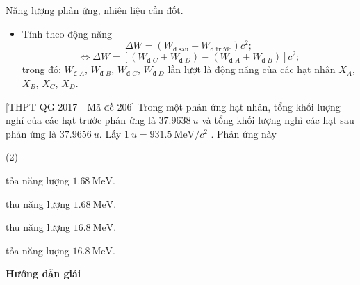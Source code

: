 \begin{dang}{Năng lượng phản ứng, nhiên liệu cần đốt.}
{\begin{itemize}
\begin{itemize}
				\item $W_{\textrm{lkr }A}$, $W_{\textrm{lkr }B}$, $W_{\textrm{lkr }C}$, $W_{\textrm{lkr }D}$ lần lượt là năng lượng liên kết riêng của các hạt nhân $X_A$, $X_B$, $X_C$, $X_D$.
				
				\item $A_A$, $A_B$, $A_C$, $A_D$ lần lượt là số khối của các hạt nhân $X_A$, $X_B$, $X_C$, $X_D$.
			\end{itemize}
			
			\item Tính theo động năng
			\begin{equation*}
				\Delta W = \left(W_\textrm{đ sau} - W_\textrm{đ trước}\right) c^2;
			\end{equation*}
			\begin{equation*}
				\Leftrightarrow \Delta W = \left[ \left(W_{\textrm{đ }C} + W_{\textrm{đ }D}\right)  - \left( W_{\textrm{đ }A} + W_{\textrm{đ }B}\right)\right]  c^2;
			\end{equation*}
			trong đó: $W_{\textrm{đ }A}$, $W_{\textrm{đ }B}$, $W_{\textrm{đ }C}$, $W_{\textrm{đ }D}$ lần lượt là động năng của các hạt nhân $X_A$, $X_B$, $X_C$, $X_D$.
	\end{itemize}}
	
	
	{
		[THPT QG 2017 - Mã đề 206] Trong một phản ứng hạt nhân, tổng khối lượng nghỉ của các hạt trước phản ứng là $\SI{37,9638}{u}$ và tổng khối lượng nghỉ các hạt sau phản ứng là  $\SI{37,9656}{u}$. Lấy $\SI{1}{u}=\SI{931,5}{\mega\electronvolt/c^2}$ . Phản ứng này
		
		\begin{mcq}(2)
			\item tỏa năng lượng $\SI{1,68}{\mega\electronvolt}$.
			\item thu năng lượng $\SI{1,68}{\mega\electronvolt}$.
			\item thu năng lượng $\SI{16,8}{\mega\electronvolt}$.
			\item tỏa năng lượng $\SI{16,8}{\mega\electronvolt}$.
	\end{mcq}}
	{
		\begin{center}
			\textbf{Hướng dẫn giải}
		\end{center}
		
}
\end{dang}

